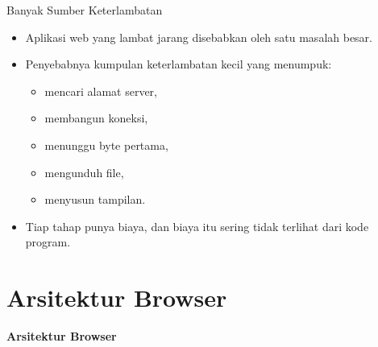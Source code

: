 \documentclass[aspectratio=169, table, 12pt]{beamer}
\begin{document}
\begin{frame}{{\Large Banyak Sumber Keterlambatan}}
  \vspace{10pt}
  \begin{itemize}
    \item Aplikasi web yang lambat jarang disebabkan oleh satu masalah besar.
    \item Penyebabnya kumpulan keterlambatan kecil yang menumpuk:
    \begin{itemize}
      \item mencari alamat server,
      \item membangun koneksi,
      \item menunggu byte pertama,
      \item mengunduh file,
      \item menyusun tampilan.
    \end{itemize}
    \item Tiap tahap punya biaya, dan biaya itu sering tidak terlihat dari
          kode program.
  \end{itemize}
\end{frame}

\section{Arsitektur Browser}

\begin{frame}{\hfill}
  \centering
  \Huge{\textbf{Arsitektur Browser}}
\end{frame}
\end{document}
